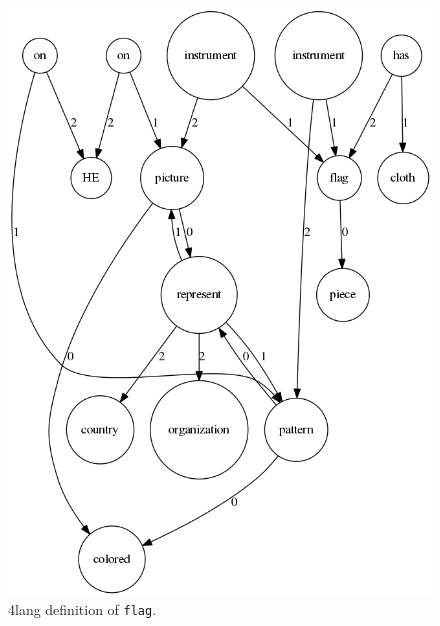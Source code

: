 \documentclass[10pt, a4paper]{article}
\begin{document}
\begin{figure}
\centering
    \includegraphics[scale=0.5]{flag.png}
\caption{4lang definition of \texttt{flag}.}
\label{fig:flag}
\end{figure}
\end{document}
